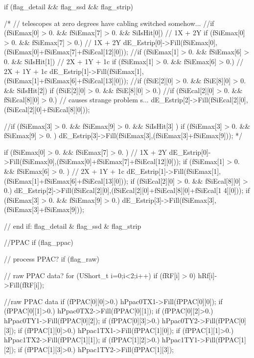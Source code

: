 \begin{DoxyCode}
{{{{{{{{      if (flag_detail && flag_ssd && flag_strip){
         
/*
        // telescopes at zero degrees have cabling switched somehow...
        //if (fSiEmax[0] > 0. && fSiEmax[7] > 0. && SiIsHit[0]) // 1X + 2Y 
        if (fSiEmax[0] > 0. && fSiEmax[7] > 0.) // 1X + 2Y 
          dE_Estrip[0]->Fill(fSiEmax[0],(fSiEmax[0]+fSiEmax[7]+fSiEcal[12][0]));
        //if (fSiEmax[1] > 0. && fSiEmax[6] > 0. && SiIsHit[1]) // 2X + 1Y + 1c
        if (fSiEmax[1] > 0. && fSiEmax[6] > 0.) // 2X + 1Y + 1c
          dE_Estrip[1]->Fill(fSiEmax[1],(fSiEmax[1]+fSiEmax[6]+fSiEcal[13][0]));
        //if (fSiE[2][0] > 0. && fSiE[8][0] > 0. && SiIsHit[2])
        if (fSiE[2][0] > 0. && fSiE[8][0] > 0.)
        //if (fSiEcal[2][0] > 0. && fSiEcal[8][0] > 0.) // causes strange problem
      s...
          dE_Estrip[2]->Fill(fSiEcal[2][0],(fSiEcal[2][0]+fSiEcal[8][0]));
        
        //if (fSiEmax[3] > 0. && fSiEmax[9] > 0. && SiIsHit[3] )
        if (fSiEmax[3] > 0. && fSiEmax[9] > 0. )
          dE_Estrip[3]->Fill(fSiEmax[3],(fSiEmax[3]+fSiEmax[9]));
  */    


        if (fSiEmax[0] > 0. && fSiEmax[7] > 0. ) // 1X + 2Y 
          dE_Estrip[0]->Fill(fSiEmax[0],(fSiEmax[0]+fSiEmax[7]+fSiEcal[12][0]));
        if (fSiEmax[1] > 0. && fSiEmax[6] > 0. ) // 2X + 1Y + 1c
          dE_Estrip[1]->Fill(fSiEmax[1],(fSiEmax[1]+fSiEmax[6]+fSiEcal[13][0]));
        if (fSiEcal[2][0] > 0. && fSiEcal[8][0] > 0.) 
          dE_Estrip[2]->Fill(fSiEcal[2][0],(fSiEcal[2][0]+fSiEcal[8][0]+fSiEcal[1
      4][0]));
        if (fSiEmax[3] > 0. && fSiEmax[9] > 0.) 
          dE_Estrip[3]->Fill(fSiEmax[3],(fSiEmax[3]+fSiEmax[9]));
  
      } // end if: flag_detail & flag_ssd & flag_strip

      //PPAC
      if (flag_ppac) { // process PPAC?
        if (flag_raw) { // raw PPAC data?
          for (UShort_t i=0;i<2;i++) if (fRF[i] > 0) hRf[i]->Fill(fRF[i]);
          
          //raw PPAC data
          if (fPPAC[0][0]>0.) hPpac0TX1->Fill(fPPAC[0][0]);
          if (fPPAC[0][1]>0.) hPpac0TX2->Fill(fPPAC[0][1]);
          if (fPPAC[0][2]>0.) hPpac0TY1->Fill(fPPAC[0][2]);
          if (fPPAC[0][3]>0.) hPpac0TY2->Fill(fPPAC[0][3]);
          if (fPPAC[1][0]>0.) hPpac1TX1->Fill(fPPAC[1][0]);
          if (fPPAC[1][1]>0.) hPpac1TX2->Fill(fPPAC[1][1]);
          if (fPPAC[1][2]>0.) hPpac1TY1->Fill(fPPAC[1][2]);
          if (fPPAC[1][3]>0.) hPpac1TY2->Fill(fPPAC[1][3]);
        
}}}}}}}}}}
\end{DoxyCode}

